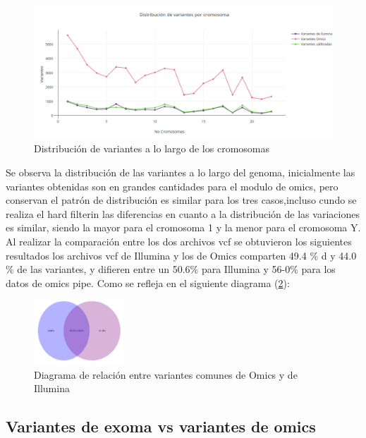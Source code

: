 \begin{figure}[H]
	\centering
	\includegraphics[width=1\textwidth]{Kap2/variaciones}
	\caption{Distribución de variantes a lo largo de los cromosomas} \label{fig:distribucion}
\end{figure}

Se observa la distribución de las variantes a lo largo del genoma, inicialmente las variantes obtenidas son en grandes cantidades para el modulo de omics, pero conservan el patrón de distribución es similar para los tres casos,incluso cundo se realiza el hard filterin las diferencias en cuanto a la distribución de las variaciones es similar, siendo la mayor para el cromosoma 1 y la menor para el cromosoma Y. \\

Al realizar la comparación entre los dos archivos vcf se obtuvieron los siguientes resultados los archivos vcf de Illumina y los de Omics comparten 49.4 \% d y 44.0 \% de las variantes, y difieren entre un 50.6\% para Illumina y 56-0\% para los datos de omics pipe. Como se refleja en el siguiente diagrama (\ref{fig:diagrama}):

\begin{figure}[H]
	\centering
	\includegraphics[width=0.3\textwidth]{Kap2/diagrama1}
	\caption{Diagrama de relación entre variantes comunes de Omics y de Illumina} \label{fig:diagrama}
\end{figure}

\subsection*{Variantes de exoma vs variantes de omics}

